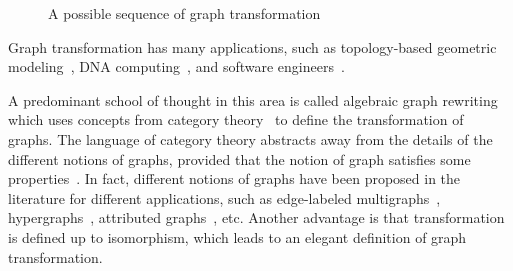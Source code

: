 \begin{figure}[htbp]
{
}
        \caption{A possible sequence of graph transformation}
        \label{fig:intro_sequence_of_transformation}
    \end{figure}
 Graph transformation has many applications, such as topology-based geometric modeling~\cite{poudret2007topology, belhaouari2014jerboa, bellet2017geometric, pascale2022Geometric_modeling}, DNA computing~\cite{harju2004tutorial_dna_computation}, and software engineers~\cite{heckel2020software_engineers}.
 
 A predominant school of thought in this area is called algebraic graph rewriting~\cite{ehrig1997handbook1,ehrig1999handbook2,ehrig1999handbook3} which uses concepts from category theory~\cite{pierce1991basic,barr1990category,maclane2013categories} to define the transformation of graphs. The language of category theory abstracts away from the details of the different notions of graphs, provided that the notion of graph satisfies some properties~\cite{lack2004adhesive,overbeek2023graph}. 
 In fact, different notions of graphs have been proposed in the literature for different applications, such as edge-labeled multigraphs~\cite{konig2018atutorial,corradini1997algebraic}, hypergraphs~\cite{plump1993hypergraph}, attributed graphs~\cite{ehrig2006fundamentals}, etc. Another advantage is that transformation is defined up to isomorphism, which leads to an elegant definition of graph transformation.

